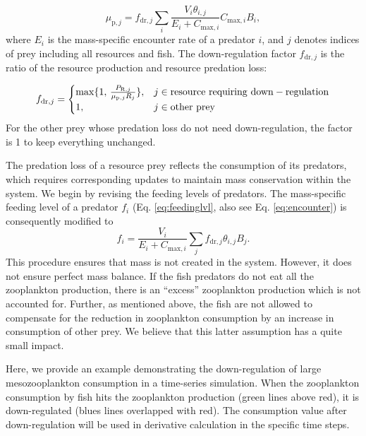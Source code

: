 \documentclass[
]{article}
\begin{document}
\begin{equation}
\mu_{\mathrm{p},j} = f_{\mathrm{dr},j} \sum_i  \frac{V_i \theta_{i,j}}{E_i+C_{\mathrm{max},i}} C_{\mathrm{max},i} B_i,
\end{equation} where \(E_i\) is the mass-specific encounter rate of a
predator \(i\), and \(j\) denotes indices of prey including all
resources and fish. The down-regulation factor \(f_{\mathrm{dr},j}\) is
the ratio of the resource production and resource predation loss:

\begin{equation}
    f_{\mathrm{dr},j} =
  \begin{cases}
\max\{1, \, \frac{P_{\mathrm{R},j}}{\mu_{\mathrm{p},j} R_j} \},      & \text{$ j \in \mathrm{resource\ requiring\ down}-\mathrm{regulation} $} \\
     1, & \text{$ j \in \mathrm{other\ prey} $} 
  \end{cases}
\end{equation} For the other prey whose predation loss do not need
down-regulation, the factor is 1 to keep everything unchanged.

The predation loss of a resource prey reflects the consumption of its
predators, which requires corresponding updates to maintain mass
conservation within the system. We begin by revising the feeding levels
of predators. The mass-specific feeding level of a predator \(f_i\) (Eq.
\ref{eq:feedinglvl}, also see Eq. \ref{eq:encounter}) is consequently
modified to \begin{equation}
f_{i} = \frac{V_{i}}{E_{i}+C_{\mathrm{max},i}}  \sum_{j} f_{\mathrm{dr},j} \theta_{i,j} B_j  .
\end{equation} This procedure ensures that mass is not created in the
system. However, it does not ensure perfect mass balance. If the fish
predators do not eat all the zooplankton production, there is an
``excess'' zooplankton production which is not accounted for. Further,
as mentioned above, the fish are not allowed to compensate for the
reduction in zooplankton consumption by an increase in consumption of
other prey. We believe that this latter assumption has a quite small
impact.

Here, we provide an example demonstrating the down-regulation of large
mesozooplankton consumption in a time-series simulation. When the
zooplankton consumption by fish hits the zooplankton production (green
lines above red), it is down-regulated (blues lines overlapped with
red). The consumption value after down-regulation will be used in
derivative calculation in the specific time steps.
\end{document}

